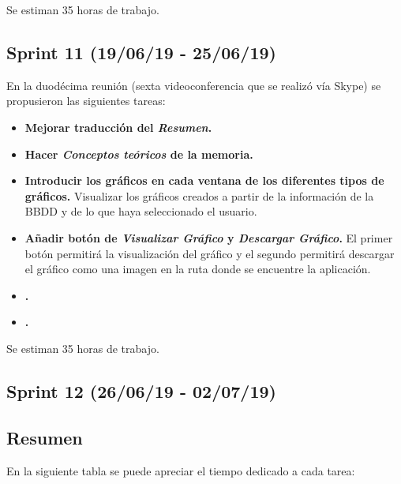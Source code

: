 Se estiman 35 horas de trabajo.


\subsection{Sprint 11 (19/06/19 - 25/06/19)}
En la duodécima reunión (sexta videoconferencia que se realizó vía Skype) se propusieron las siguientes tareas:

\begin{itemize}
\item
\textbf{Mejorar traducción del \emph{Resumen}.}
\item
\textbf{Hacer \emph{Conceptos teóricos} de la memoria.}
\item
\textbf{Introducir los gráficos en cada ventana de los diferentes tipos de gráficos.} Visualizar los gráficos creados a partir de la información de la BBDD y de lo que haya seleccionado el usuario.
\item
\textbf{Añadir botón de \emph{Visualizar Gráfico} y \emph{Descargar Gráfico}.} El primer botón permitirá la visualización del gráfico y el segundo permitirá descargar el gráfico como una imagen en la ruta donde se encuentre la aplicación.
\item
\textbf{    .}
\item
\textbf{    .}
\end{itemize}


Se estiman 35 horas de trabajo.

\subsection{Sprint 12 (26/06/19 - 02/07/19)}



\subsection{Resumen}
En la siguiente tabla se puede apreciar el tiempo dedicado a cada tarea:


